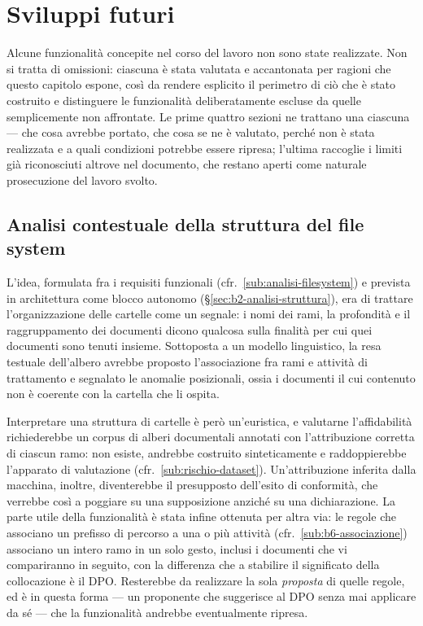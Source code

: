 \chapter{Sviluppi futuri}
\label{cap:sviluppi-futuri}

Alcune funzionalità concepite nel corso del lavoro non sono state realizzate. Non si tratta di omissioni: ciascuna è stata valutata e accantonata per ragioni che questo capitolo espone, così da rendere esplicito il perimetro di ciò che è stato costruito e distinguere le funzionalità deliberatamente escluse da quelle semplicemente non affrontate. Le prime quattro sezioni ne trattano una ciascuna --- che cosa avrebbe portato, che cosa se ne è valutato, perché non è stata realizzata e a quali condizioni potrebbe essere ripresa; l'ultima raccoglie i limiti già riconosciuti altrove nel documento, che restano aperti come naturale prosecuzione del lavoro svolto.

\section{Analisi contestuale della struttura del file system}
\label{sec:sf-analisi-struttura}

L'idea, formulata fra i requisiti funzionali (cfr.~\ref{sub:analisi-filesystem}) e prevista in architettura come blocco autonomo (§\ref{sec:b2-analisi-struttura}), era di trattare l'organizzazione delle cartelle come un segnale: i nomi dei rami, la profondità e il raggruppamento dei documenti dicono qualcosa sulla finalità per cui quei documenti sono tenuti insieme. Sottoposta a un modello linguistico, la resa testuale dell'albero avrebbe proposto l'associazione fra rami e attività di trattamento e segnalato le anomalie posizionali, ossia i documenti il cui contenuto non è coerente con la cartella che li ospita.

Interpretare una struttura di cartelle è però un'euristica, e valutarne l'affidabilità richiederebbe un corpus di alberi documentali annotati con l'attribuzione corretta di ciascun ramo: non esiste, andrebbe costruito sinteticamente e raddoppierebbe l'apparato di valutazione (cfr.~\ref{sub:rischio-dataset}). Un'attribuzione inferita dalla macchina, inoltre, diventerebbe il presupposto dell'esito di conformità, che verrebbe così a poggiare su una supposizione anziché su una dichiarazione. La parte utile della funzionalità è stata infine ottenuta per altra via: le regole che associano un prefisso di percorso a una o più attività (cfr.~\ref{sub:b6-associazione}) associano un intero ramo in un solo gesto, inclusi i documenti che vi compariranno in seguito, con la differenza che a stabilire il significato della collocazione è il DPO. Resterebbe da realizzare la sola \emph{proposta} di quelle regole, ed è in questa forma --- un proponente che suggerisce al DPO senza mai applicare da sé --- che la funzionalità andrebbe eventualmente ripresa.

